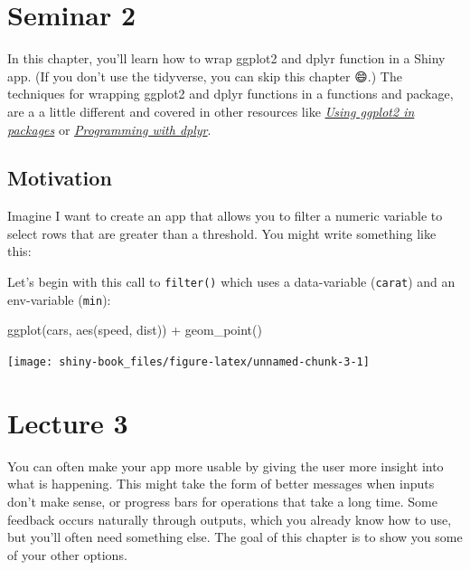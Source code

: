 \documentclass[
]{article}
\newenvironment{Shaded}{\begin{snugshade}}{\end{snugshade}}
\newcommand{\FunctionTok}[1]{\textcolor[rgb]{0.00,0.00,0.00}{#1}}
\newcommand{\NormalTok}[1]{#1}
\newcommand{\SpecialCharTok}[1]{\textcolor[rgb]{0.00,0.00,0.00}{#1}}
\begin{document}
\hypertarget{seminar2}{%
\section{Seminar 2}\label{seminar2}}

In this chapter, you'll learn how to wrap ggplot2 and dplyr function in a Shiny app.
(If you don't use the tidyverse, you can skip this chapter 😄.) The techniques for wrapping ggplot2 and dplyr functions in a functions and package, are a a little different and covered in other resources like \href{http://ggplot2.tidyverse.org/dev/articles/ggplot2-in-packages.html}{\emph{Using ggplot2 in packages}} or \href{http://dplyr.tidyverse.org/articles/programming.html}{\emph{Programming with dplyr}}.

\hypertarget{tidy-motivation}{%
\subsection{Motivation}\label{tidy-motivation}}

Imagine I want to create an app that allows you to filter a numeric variable to select rows that are greater than a threshold.
You might write something like this:

Let's begin with this call to \texttt{filter()} which uses a data-variable (\texttt{carat}) and an env-variable (\texttt{min}):

\begin{Shaded}
\begin{Highlighting}[]
\FunctionTok{ggplot}\NormalTok{(cars, }\FunctionTok{aes}\NormalTok{(speed, dist)) }\SpecialCharTok{+} 
  \FunctionTok{geom\_point}\NormalTok{()}
\end{Highlighting}
\end{Shaded}

\begin{center}\texttt{[image: shiny-book\_files/figure-latex/unnamed-chunk-3-1]} \end{center}

\hypertarget{lecture3}{%
\section{Lecture 3}\label{lecture3}}

You can often make your app more usable by giving the user more insight into what is happening.
This might take the form of better messages when inputs don't make sense, or progress bars for operations that take a long time.
Some feedback occurs naturally through outputs, which you already know how to use, but you'll often need something else.
The goal of this chapter is to show you some of your other options.
\end{document}
